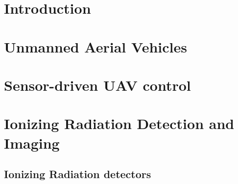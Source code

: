 \documentclass[a4paper,11pt,titlepage,twoside]{article}
\begin{document}


\pagestyle{fancy}
\cfoot{\thepage}
\tableofcontents
{}
\cleardoublepage



\section{Introduction}

\clearpage


\section{Unmanned Aerial Vehicles}

\clearpage


\section{Sensor-driven UAV control}

\clearpage


\section{Ionizing Radiation Detection and Imaging}


\subsection{Ionizing Radiation detectors}
\end{document}
